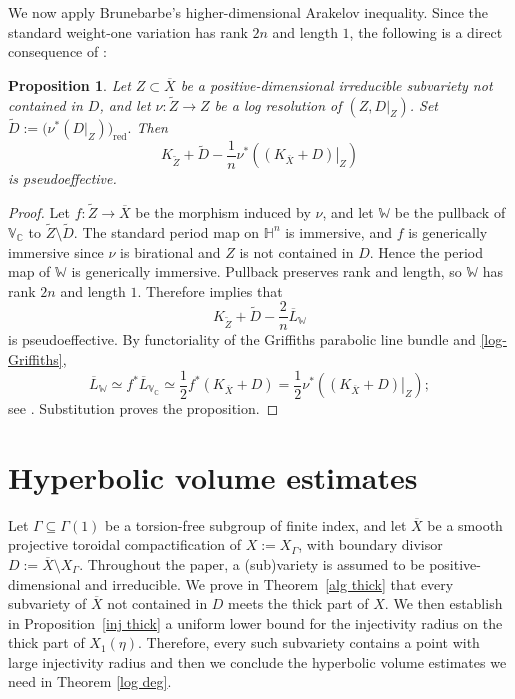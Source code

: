 \documentclass[12 pt]{amsart}
\newtheorem{Proposition}[theorem]{Proposition}
\theoremstyle{definition}
\begin{document}
We now apply Brunebarbe's higher-dimensional Arakelov inequality. Since the standard weight-one variation has rank $2n$ and length $1$, the following is a direct consequence of \cite[Theorems~1.6 and~2.3]{brunebarbe2020increasing}:

\begin{Proposition}\label{Arakelov}
Let $Z\subset\overline X$ be a positive-dimensional irreducible subvariety not contained in $D$, and let $\nu:\widetilde Z\to Z$ be a log resolution of $(Z,D|_Z)$. Set
\(
\widetilde D:=\bigl(\nu^*(D|_Z)\bigr)_{\mathrm{red}}.
\)
Then
\[
K_{\widetilde Z}+\widetilde D-\frac{1}{n}\nu^*
\left(\left.(K_{\overline X}+D)\right|_Z\right)
\]
is pseudoeffective.
\end{Proposition}

\begin{proof}
Let $f:\widetilde Z\to\overline X$ be the morphism induced by $\nu$, and let $\mathbb W$ be the pullback of $\mathbb V_{\mathbb C}$ to $\widetilde Z\setminus\widetilde D$. The standard period map on $\mathbb H^n$ is immersive, and $f$ is generically immersive since $\nu$ is birational and $Z$ is not contained in $D$. Hence the period map of $\mathbb W$ is generically immersive. Pullback preserves rank and length, so $\mathbb W$ has rank $2n$ and length $1$. Therefore \cite[Theorems~1.6 and~2.3]{brunebarbe2020increasing} implies that
\[
K_{\widetilde Z}+\widetilde D-\frac{2}{n}\overline L_{\mathbb W}
\]
is pseudoeffective. By functoriality of the Griffiths parabolic line bundle and \eqref{log-Griffiths},
\[
\overline L_{\mathbb W}
\simeq f^*\overline L_{\mathbb V_{\mathbb C}}
\simeq\frac{1}{2}f^*(K_{\overline X}+D)
=\frac{1}{2}\nu^*
\left(\left.(K_{\overline X}+D)\right|_Z\right);
\]
see \cite[\S\S 2.2 and 2.4]{brunebarbe2020increasing}. Substitution proves the proposition.
\end{proof}



\section{Hyperbolic volume estimates}

Let \(\Gamma\subseteq\Gamma(1)\) be a torsion-free subgroup of finite index, and let \(\overline X\) be a smooth projective toroidal compactification of \(X:=X_\Gamma\), with boundary divisor \(D:=\overline X\setminus X_\Gamma\). Throughout the paper, a (sub)variety is assumed to be positive-dimensional and irreducible. We prove in Theorem~\ref{alg thick} that every subvariety of \(\overline X\) not contained in \(D\) meets the thick part of \(X\). We then establish in Proposition~\ref{inj thick} a uniform lower bound for the injectivity radius on the thick part of $X_1(\eta)$. Therefore, every such subvariety contains a point with large injectivity radius and then we conclude the hyperbolic volume estimates we need in Theorem \ref{log deg}. 
\end{document}

